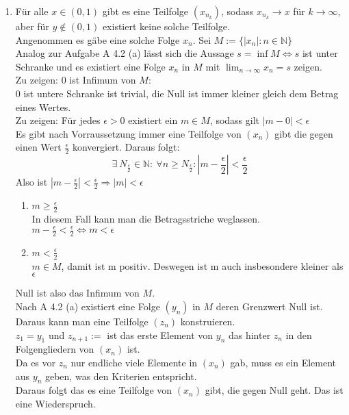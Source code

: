 \documentclass{article}
\begin{document}
\begin{enumerate}[ label = (\roman*)]
            \item Für alle \( x \in (0, 1) \) gibt es eine Teilfolge \( (x_{n_k}) \), sodass \(x_{n_k} \to x\) für \( k \to \infty \), aber für \(y \notin (0, 1)\) existiert keine solche Teilfolge. \\
            Angenommen es gäbe eine solche Folge \(x_n\).
            Sei \( M := \{ |x_n| : n \in \mathbb{N} \} \) \\
            Analog zur Aufgabe A 4.2 (a) lässt sich die Aussage 
            \(s = \inf M \Leftrightarrow s\) ist unter Schranke und es existiert eine Folge \(x_n\) in \(M\) mit \(\lim_{n \to \infty} x_n = s \) zeigen. \\
            Zu zeigen: 0 ist Infimum von \(M\): \\
            0 ist untere Schranke ist trivial, die Null ist immer kleiner gleich dem Betrag eines Wertes. \\
            Zu zeigen: Für jedes \(\epsilon > 0\) existiert ein \( m \in M \), sodass gilt \(|m - 0| < \epsilon \) \\
            Es gibt nach Vorraussetzung immer eine Teilfolge von \((x_n)\) gibt die gegen einen Wert \( \frac{\epsilon}{2} \) konvergiert.
            Daraus folgt:
            \[ \exists \: N_{\frac{\epsilon}{2}} \in \mathbb{N}: \: \forall n \geq N_{\frac{\epsilon}{2}}: |m - \frac{\epsilon}{2} | < \frac{\epsilon}{2} \]
            Also ist \( |m - \frac{\epsilon}{2} | < \frac{\epsilon}{2} \Rightarrow |m| < \epsilon \)
            \begin{enumerate}[ label = \arabic*. Fall ]
                \item \( m \geq \frac{\epsilon}{2} \) \\
                In diesem Fall kann man die Betragsstriche weglassen. \\
                \(m - \frac{\epsilon}{2} < \frac{\epsilon}{2} \Leftrightarrow m < \epsilon \)

                \item \( m < \frac{\epsilon}{2} \) \\
                \(m \in M\), damit ist m positiv. Deswegen ist m auch insbesondere kleiner als \( \epsilon \)
            \end{enumerate}
            Null ist also das Infimum von \(M\). \\
            Nach A 4.2 (a) existiert eine Folge \((y_n)\) in \(M\) deren Grenzwert Null ist. \\
            Daraus kann man eine Teilfolge \((z_n)\) konstruieren. \\
            \(z_1 = y_1\) und \(z_{n+1} :=\) ist das erste Element von \(y_n\) das hinter \(z_n\) in den Folgengliedern von \((x_n)\) ist. \\
            Da es vor \(z_n\) nur endliche viele Elemente in \((x_n)\) gab, muss es ein Element aus \(y_n\) geben, was den Kriterien entspricht. \\
            Daraus folgt das es eine Teilfolge von \((x_n)\) gibt, die gegen Null geht.
            Das ist eine Wiederspruch.

        \end{enumerate}
\end{document}
